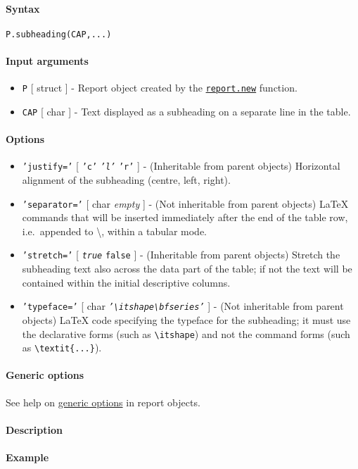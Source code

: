 


	\paragraph{Syntax}

\begin{verbatim}
P.subheading(CAP,...)
\end{verbatim}

\paragraph{Input arguments}

\begin{itemize}
\item
  \texttt{P} {[} struct {]} - Report object created by the
  \href{report/new}{\texttt{report.new}} function.
\item
  \texttt{CAP} {[} char {]} - Text displayed as a subheading on a
  separate line in the table.
\end{itemize}

\paragraph{Options}

\begin{itemize}
\item
  \texttt{'justify='} {[} \texttt{'c'} \textbar{} \emph{\texttt{'l'}}
  \textbar{} \texttt{'r'} {]} - (Inheritable from parent objects)
  Horizontal alignment of the subheading (centre, left, right).
\item
  \texttt{'separator='} {[} char \textbar{} \emph{empty} {]} - (Not
  inheritable from parent objects) LaTeX commands that will be inserted
  immediately after the end of the table row, i.e.~appended to
  \textbackslash{}, within a tabular mode.
\item
  \texttt{'stretch='} {[} \emph{\texttt{true}} \textbar{} \texttt{false}
  {]} - (Inheritable from parent objects) Stretch the subheading text
  also across the data part of the table; if not the text will be
  contained within the initial descriptive columns.
\item
  \texttt{'typeface='} {[} char \textbar{}
  \emph{\texttt{'\textbackslash{}itshape\textbackslash{}bfseries'}} {]}
  - (Not inheritable from parent objects) LaTeX code specifying the
  typeface for the subheading; it must use the declarative forms (such
  as \texttt{\textbackslash{}itshape}) and not the command forms (such
  as \texttt{\textbackslash{}textit\{...\}}).
\end{itemize}

\paragraph{Generic options}

See help on \href{report/Contents}{generic options} in report objects.

\paragraph{Description}

\paragraph{Example}


